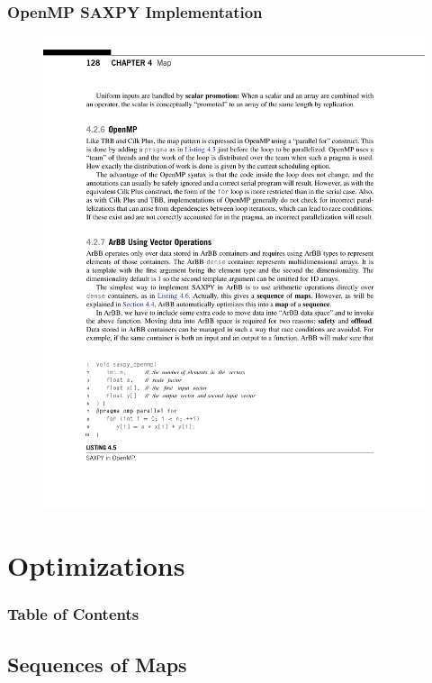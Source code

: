 \documentclass[xcolor=dvipsnames]{beamer}
\begin{document}
		\begin{frame} \frametitle{OpenMP SAXPY Implementation}
			\begin{figure}
				\centering
				\includegraphics[width=115mm]{images/listing-4-5.pdf}
			\end{figure}
		\end{frame}


\section{Optimizations} 

	\begin{frame} \frametitle{Table of Contents}
		\tableofcontents[currentsection]
	\end{frame} 
	
	
	\subsection{Sequences of Maps}
	
\end{document}
